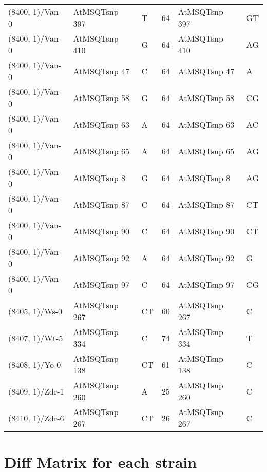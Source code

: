 \begin{center}
\begin{longtable}{|l|l|l|l|l|l|}
(8400, 1)/Van-0&AtMSQTsnp 397&T&64&AtMSQTsnp 397&GT\\
(8400, 1)/Van-0&AtMSQTsnp 410&G&64&AtMSQTsnp 410&AG\\
(8400, 1)/Van-0&AtMSQTsnp 47&C&64&AtMSQTsnp 47&A\\
(8400, 1)/Van-0&AtMSQTsnp 58&G&64&AtMSQTsnp 58&CG\\
(8400, 1)/Van-0&AtMSQTsnp 63&A&64&AtMSQTsnp 63&AC\\
(8400, 1)/Van-0&AtMSQTsnp 65&A&64&AtMSQTsnp 65&AG\\
(8400, 1)/Van-0&AtMSQTsnp 8&G&64&AtMSQTsnp 8&AG\\
(8400, 1)/Van-0&AtMSQTsnp 87&C&64&AtMSQTsnp 87&CT\\
(8400, 1)/Van-0&AtMSQTsnp 90&C&64&AtMSQTsnp 90&CT\\
(8400, 1)/Van-0&AtMSQTsnp 92&A&64&AtMSQTsnp 92&G\\
(8400, 1)/Van-0&AtMSQTsnp 97&C&64&AtMSQTsnp 97&CG\\
(8405, 1)/Ws-0&AtMSQTsnp 267&CT&60&AtMSQTsnp 267&C\\
(8407, 1)/Wt-5&AtMSQTsnp 334&C&74&AtMSQTsnp 334&T\\
(8408, 1)/Yo-0&AtMSQTsnp 138&CT&61&AtMSQTsnp 138&C\\
(8409, 1)/Zdr-1&AtMSQTsnp 260&A&25&AtMSQTsnp 260&C\\
(8410, 1)/Zdr-6&AtMSQTsnp 267&CT&26&AtMSQTsnp 267&C\\
\hline
\end{longtable}
\end{center}

\section{Diff Matrix for each strain} \label{section_strain_wise}
